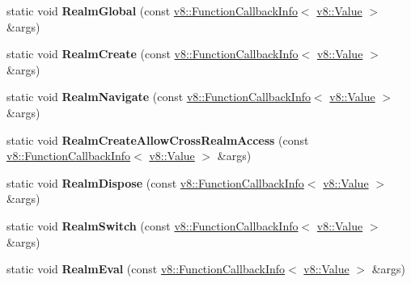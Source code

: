 \begin{DoxyCompactItemize}
static void {\bfseries Realm\+Global} (const \mbox{\hyperlink{classv8_1_1FunctionCallbackInfo}{v8\+::\+Function\+Callback\+Info}}$<$ \mbox{\hyperlink{classv8_1_1Value}{v8\+::\+Value}} $>$ \&args)
\item 
\mbox{\label{classv8_1_1Shell_a321307d1e9e6a587bbf3091195346f46}} 
static void {\bfseries Realm\+Create} (const \mbox{\hyperlink{classv8_1_1FunctionCallbackInfo}{v8\+::\+Function\+Callback\+Info}}$<$ \mbox{\hyperlink{classv8_1_1Value}{v8\+::\+Value}} $>$ \&args)
\item 
\mbox{\label{classv8_1_1Shell_af7b8027ff5eeea256c0ad789518ed6a4}} 
static void {\bfseries Realm\+Navigate} (const \mbox{\hyperlink{classv8_1_1FunctionCallbackInfo}{v8\+::\+Function\+Callback\+Info}}$<$ \mbox{\hyperlink{classv8_1_1Value}{v8\+::\+Value}} $>$ \&args)
\item 
\mbox{\label{classv8_1_1Shell_a6542d3a482412f8a90a7738696868a37}} 
static void {\bfseries Realm\+Create\+Allow\+Cross\+Realm\+Access} (const \mbox{\hyperlink{classv8_1_1FunctionCallbackInfo}{v8\+::\+Function\+Callback\+Info}}$<$ \mbox{\hyperlink{classv8_1_1Value}{v8\+::\+Value}} $>$ \&args)
\item 
\mbox{\label{classv8_1_1Shell_a8bb9ca4c151b7ed3e6bdd64d3f814a65}} 
static void {\bfseries Realm\+Dispose} (const \mbox{\hyperlink{classv8_1_1FunctionCallbackInfo}{v8\+::\+Function\+Callback\+Info}}$<$ \mbox{\hyperlink{classv8_1_1Value}{v8\+::\+Value}} $>$ \&args)
\item 
\mbox{\label{classv8_1_1Shell_ab4b04a517ba41c1843ae1db5f03ee48b}} 
static void {\bfseries Realm\+Switch} (const \mbox{\hyperlink{classv8_1_1FunctionCallbackInfo}{v8\+::\+Function\+Callback\+Info}}$<$ \mbox{\hyperlink{classv8_1_1Value}{v8\+::\+Value}} $>$ \&args)
\item 
\mbox{\label{classv8_1_1Shell_a2188e58aebf24a2991a9e5a8c6cc457c}} 
static void {\bfseries Realm\+Eval} (const \mbox{\hyperlink{classv8_1_1FunctionCallbackInfo}{v8\+::\+Function\+Callback\+Info}}$<$ \mbox{\hyperlink{classv8_1_1Value}{v8\+::\+Value}} $>$ \&args)
\item 
\mbox{\label{classv8_1_1Shell_a18a4d640a41f7fdc9a178e3db8408a8f}} 

\end{DoxyCompactItemize}
